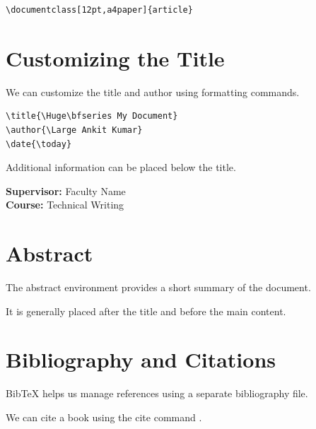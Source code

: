 \documentclass[12pt,a4paper]{article}
\begin{document}
\begin{verbatim}
\documentclass[12pt,a4paper]{article}
\end{verbatim}

\section{Customizing the Title}

We can customize the title and author using
formatting commands.

\begin{verbatim}
\title{\Huge\bfseries My Document}
\author{\Large Ankit Kumar}
\date{\today}
\end{verbatim}

Additional information can be placed below the title.

\begin{center}
    \textbf{Supervisor:} Faculty Name \\
    \textbf{Course:} Technical Writing
\end{center}

\section{Abstract}

The abstract environment provides a short summary
of the document.

It is generally placed after the title and before
the main content.

\section{Bibliography and Citations}

BibTeX helps us manage references using a
separate bibliography file.

We can cite a book using the cite command
\cite{kn:gnus}.



\end{document}
